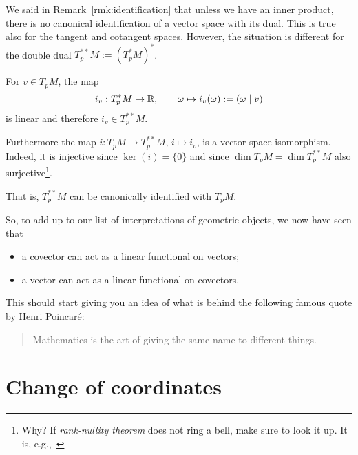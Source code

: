 \begin{remark}
  We said in Remark~\ref{rmk:identification} that unless we have an inner product, there is no canonical identification of a vector space with its dual.
  This is true also for the tangent and cotangent spaces.
  However, the situation is different for the double dual $T^{**}_pM := (T^*_pM)^*$.
  
  For $v\in T_p M$, the map
  \begin{equation}
    i_v: T_p^*M\to \mathbb{R}, \qquad
    \omega \mapsto i_v(\omega) := (\omega\mid v)
  \end{equation}
  is linear and therefore $i_v\in T^{**}_pM$.

  Furthermore the map $i : T_pM \to T_p^{**}M$, $i\mapsto i_v$, is a vector space isomorphism. Indeed, it is injective since $\ker(i) = \{0\}$ and since $\dim T_p M = \dim T^{**}_p M$ also surjective\footnote{Why? If \emph{rank-nullity theorem} does not ring a bell, make sure to look it up. It is, e.g.,~\cite[Corollary B.21]{book:lee}}.

  That is, $T^{**}_pM$ can be canonically identified with $T_p M$.

  So, to add up to our list of interpretations of geometric objects, we now have seen that
  \begin{itemize}
    \item a covector can act as a linear functional on vectors;
    \item a vector can act as a linear functional on covectors.
  \end{itemize}
\end{remark}

This should start giving you an idea of what is behind the following famous quote by Henri Poincar\'e:
\begin{quote}
  Mathematics is the art of giving the same name to different things.
\end{quote}

\section{Change of coordinates}

